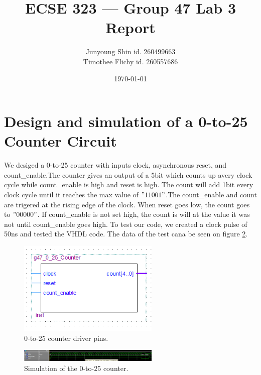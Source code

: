 \documentclass[10pt]{article}
\title{ECSE 323 --- Group 47 Lab 3 Report}
\author{Junyoung Shin id. 260499663\\ Timothee Flichy id. 260557686}
\date{\today}
\begin{document}
\maketitle
\section*{Design and simulation of a 0-to-25 Counter Circuit}
We desiged a 0-to-25 counter with inputs clock, asynchronous reset, and count\_enable.The counter gives an output of a 5bit which counts up avery clock cycle while count\_enable is high and reset is high. The count will add 1bit every clock cycle until it reaches the max value of $"11001"$.The count\_enable and count are trigered at the rising edge of the clock. When reset goes low, the count goes to $"00000"$. If count\_enable is not set high, the count is will at the value it was not until count\_enable goes high.
To test our code, we created a clock pulse of 50ns and tested the VHDL code. The data of the test cana be seen on figure \ref{fig:count_test}.
\begin{figure}[!htb]
    \centering
    \includegraphics[width=0.6\textwidth]{./counter_0to25.png}
    \caption{0-to-25 counter driver pins.}
    \label{fig:count_pin}
\end{figure}
\begin{figure}[!htb]
    \centering
    \includegraphics[width=0.6\textwidth]{./test_0to25.png}
    \caption{Simulation of the 0-to-25 counter.}
    \label{fig:count_test}
\end{figure}
\end{document}
